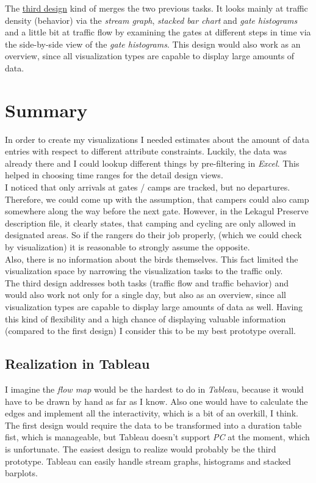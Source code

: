 \documentclass{article}
\begin{document}
The  \hyperref[fig:design3]{third design} kind of merges the two previous tasks. It looks mainly at traffic density (behavior) via the \textit{stream graph}, \textit{stacked bar chart} and \textit{gate histograms} and a little bit at traffic flow by examining the gates at different steps in time via the side-by-side view of the \textit{gate histograms}. This design would also work as an overview, since all visualization types are capable to display large amounts of data.

\section{Summary}
In order to create my visualizations I needed estimates about the amount of data entries with respect to different attribute constraints. Luckily, the data was already there and I could lookup different things by pre-filtering in \textit{Excel}. This helped in choosing time ranges for the detail design views.\\

I noticed that only arrivals at gates / camps are tracked, but no departures. Therefore, we could come up with the assumption, that campers could also camp somewhere along the way before the next gate. However, in the Lekagul Preserve description file, it clearly states, that camping and cycling are only allowed in designated areas. So if the rangers do their job properly, (which we could check by visualization) it is reasonable to strongly assume the opposite.\\

Also, there is no information about the birds themselves. This fact limited the visualization space by narrowing the visualization tasks to the traffic only.\\

The third design addresses both tasks (traffic flow and traffic behavior) and would also work not only for a single day, but also as an overview, since all visualization types are capable to display large amounts of data as well. Having this kind of flexibility and a high chance of displaying valuable information (compared to the first design) I consider this to be my best prototype overall.

\subsection{Realization in Tableau}
I imagine the \textit{flow map} would be the hardest to do in \textit{Tableau}, because it would have to be drawn by hand as far as I know\citep{munzner2015visualization}. Also one would have to calculate the edges and implement all the interactivity, which is a bit of an overkill, I think.  The first design would require the data to be transformed into a duration table fist, which is manageable, but Tableau doesn't support \textit{PC} at the moment, which is unfortunate. The easiest design to realize would probably be the third prototype. Tableau can easily handle stream graphs, histograms and stacked barplots.



\end{document}
